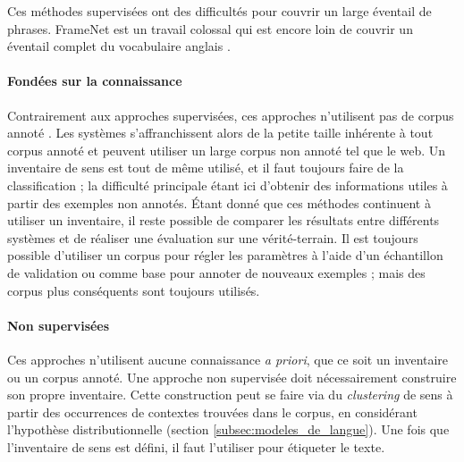 Ces méthodes supervisées ont des difficultés pour couvrir un large éventail de
phrases. FrameNet est un travail colossal qui est encore loin de couvrir un
éventail complet du vocabulaire anglais \citep[p.~155]{marquez2008semantic}.


\paragraph{Fondées sur la connaissance}

Contrairement aux approches supervisées, ces approches n'utilisent pas de
corpus annoté \citep{swier2005exploiting,pradet2013revisiting}. Les systèmes
s'affranchissent alors de la petite taille inhérente à tout corpus annoté et
peuvent utiliser un large corpus non annoté tel que le web. Un inventaire de
sens est tout de même utilisé, et il faut toujours faire de la classification ;
la difficulté principale étant ici d'obtenir des informations utiles à partir
des exemples non annotés. Étant donné que ces méthodes continuent à utiliser un
inventaire, il reste possible de comparer les résultats entre différents
systèmes et de réaliser une évaluation sur une vérité-terrain. Il est toujours
possible d'utiliser un corpus pour régler les paramètres à l'aide d'un
échantillon de validation ou comme base pour annoter de nouveaux exemples ;
mais des corpus plus conséquents sont toujours utilisés.

\paragraph{Non supervisées}


Ces approches n'utilisent aucune connaissance \textit{a priori}, que ce soit un
inventaire ou un corpus annoté. Une approche non supervisée doit nécessairement
construire son propre inventaire. Cette construction peut se faire via du
\textit{clustering} de sens à partir des occurrences de contextes trouvées dans
le corpus, en considérant l'hypothèse distributionnelle (section
\ref{subsec:modeles_de_langue}). Une fois que l'inventaire de sens est défini, il
faut l'utiliser pour étiqueter le texte.

